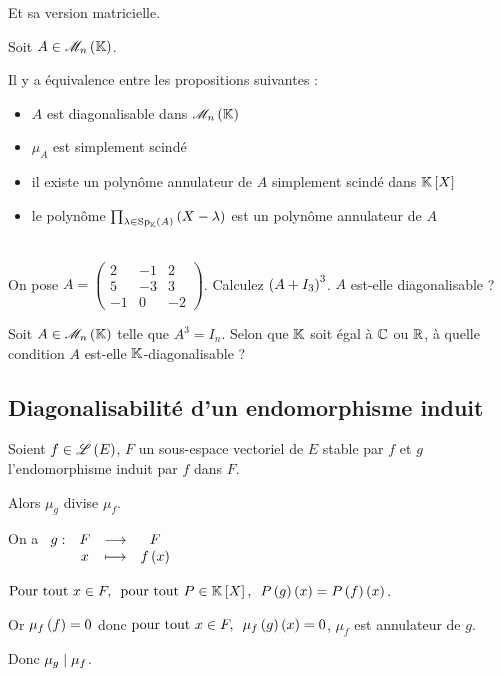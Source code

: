 Et sa version matricielle.

\begin{theo}
Soit \(A\in\M{n}\).

Il y a équivalence entre les propositions suivantes :

\begin{itemize}
    \item \(A\) est diagonalisable dans \(\M{n}\) \\
    \item \(\mu_A\) est simplement scindé \\
    \item il existe un polynôme annulateur de \(A\) simplement scindé dans \(\poly\) \\
    \item le polynôme \(\prod_{\lambda\in\Sp[\K]{A}}\paren{X-\lambda}\) est un polynôme annulateur de \(A\)
\end{itemize}
\end{theo}

\begin{exo}~\\
On pose \(A=\begin{pmatrix}
2 & -1 & 2 \\
5 & -3 & 3 \\
-1 & 0 & -2
\end{pmatrix}\). Calculez \(\left(A+I_3\right)^3\). \(A\) est-elle diagonalisable ?
\end{exo}

\begin{exo}
Soit \(A\in\M{n}\) telle que \(A^3=I_n\). Selon que \(\mathbb{K}\) soit égal à \(\mathbb{C}\) ou \(\mathbb{R}\), à quelle condition \(A\) est-elle \(\mathbb{K}\)-diagonalisable ?
\end{exo}

\subsection{Diagonalisabilité d'un endomorphisme induit}

\begin{prop}
Soient \(f\in\mathscr{L}\left(E\right)\), \(F\) un sous-espace vectoriel de \(E\) stable par \(f\) et \(g\) l'endomorphisme induit par \(f\) dans \(F\).

Alors \(\mu_g\) divise \(\mu_f\).
\end{prop}

\begin{dem}
On a \(\begin{array}[t]{cccc}g : & F & \longrightarrow & F \\ & x & \longmapsto & f\left(x\right)\end{array}\)

\(\quantifs{\Tpt x\in F;\tpt P\in\poly}P\paren{g}\paren{x}=P\paren{f}\paren{x}\).

Or \(\mu_f\left(f\right)=0\) donc \(\quantifs{\tpt x\in F}\mu_f\paren{g}\paren{x}=0\), \ie \(\mu_f\) est annulateur de \(g\).

Donc \(\mu_g\mid\mu_f\).
\end{dem}

